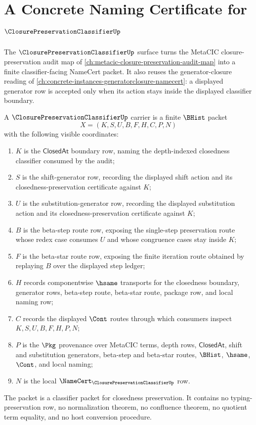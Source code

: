 \chapter{A Concrete Naming Certificate for $\ClosurePreservationClassifierUp$}
\label{ch:concrete-instances-closure-preservation-classifier-namecert}

The $\ClosurePreservationClassifierUp$ surface turns the MetaCIC closure-preservation audit map of \autoref{ch:metacic-closure-preservation-audit-map} into a finite classifier-facing NameCert packet. It also reuses the generator-closure reading of \autoref{ch:concrete-instances-generatorclosure-namecert}: a displayed generator row is accepted only when its action stays inside the displayed classifier boundary.

\begin{definition}
\label{def:closure-preservation-classifier-carrier}
A $\ClosurePreservationClassifierUp$ carrier is a finite $\BHist$ packet
$$
X=(K,S,U,B,F,H,C,P,N)
$$
with the following visible coordinates:
\begin{enumerate}
\item $K$ is the $\mathsf{ClosedAt}$ boundary row, naming the depth-indexed closedness classifier consumed by the audit;
\item $S$ is the shift-generator row, recording the displayed shift action and its closedness-preservation certificate against $K$;
\item $U$ is the substitution-generator row, recording the displayed substitution action and its closedness-preservation certificate against $K$;
\item $B$ is the beta-step route row, exposing the single-step preservation route whose redex case consumes $U$ and whose congruence cases stay inside $K$;
\item $F$ is the beta-star route row, exposing the finite iteration route obtained by replaying $B$ over the displayed step ledger;
\item $H$ records componentwise $\hsame$ transports for the closedness boundary, generator rows, beta-step route, beta-star route, package row, and local naming row;
\item $C$ records the displayed $\Cont$ routes through which consumers inspect $K,S,U,B,F,H,P,N$;
\item $P$ is the $\Pkg$ provenance over MetaCIC terms, depth rows, $\mathsf{ClosedAt}$, shift and substitution generators, beta-step and beta-star routes, $\BHist$, $\hsame$, $\Cont$, and local naming;
\item $N$ is the local $\NameCert_{\ClosurePreservationClassifierUp}$ row.
\end{enumerate}
The packet is a classifier packet for closedness preservation. It contains no typing-preservation row, no normalization theorem, no confluence theorem, no quotient term equality, and no host conversion procedure.
\end{definition}

